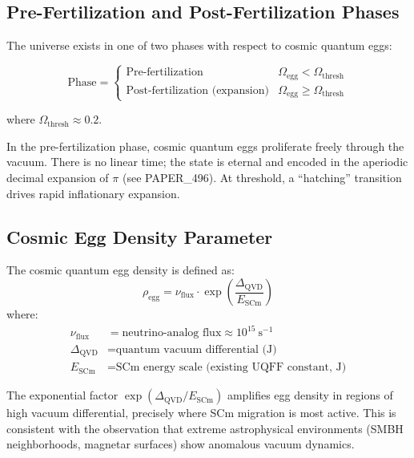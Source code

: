 \documentclass[12pt]{article}
\begin{document}
\subsection{Pre-Fertilization and Post-Fertilization Phases}

The universe exists in one of two phases with respect to cosmic quantum eggs:

\[
\text{Phase} =
\begin{cases}
    \text{Pre-fertilization} & \Omega_\text{egg} < \Omega_\text{thresh} \\[4pt]
    \text{Post-fertilization (expansion)} & \Omega_\text{egg} \geq \Omega_\text{thresh}
\end{cases}
\]

where $\Omega_\text{thresh} \approx 0.2$.

In the pre-fertilization phase, cosmic quantum eggs proliferate freely through
the vacuum. There is no linear time; the state is eternal and encoded in the
aperiodic decimal expansion of $\pi$ (see PAPER\_496). At threshold, a
``hatching'' transition drives rapid inflationary expansion.

\subsection{Cosmic Egg Density Parameter}

\begin{definition}
The cosmic quantum egg density is defined as:
\begin{equation}
    \boxed{\rho_\text{egg} = \nu_\text{flux} \cdot \exp\!\left(\frac{\Delta_\text{QVD}}{E_\text{SCm}}\right)}
    \label{eq:rho_egg}
\end{equation}
where:
\begin{align*}
    \nu_\text{flux} &= \text{neutrino-analog flux} \approx 10^{15}\ \text{s}^{-1} \\
    \Delta_\text{QVD} &= \text{quantum vacuum differential (J)} \\
    E_\text{SCm} &= \text{SCm energy scale (existing UQFF constant, J)}
\end{align*}
\end{definition}

The exponential factor $\exp(\Delta_\text{QVD}/E_\text{SCm})$ amplifies egg
density in regions of high vacuum differential, precisely where SCm migration
is most active. This is consistent with the observation that extreme
astrophysical environments (SMBH neighborhoods, magnetar surfaces) show
anomalous vacuum dynamics.
\end{document}
